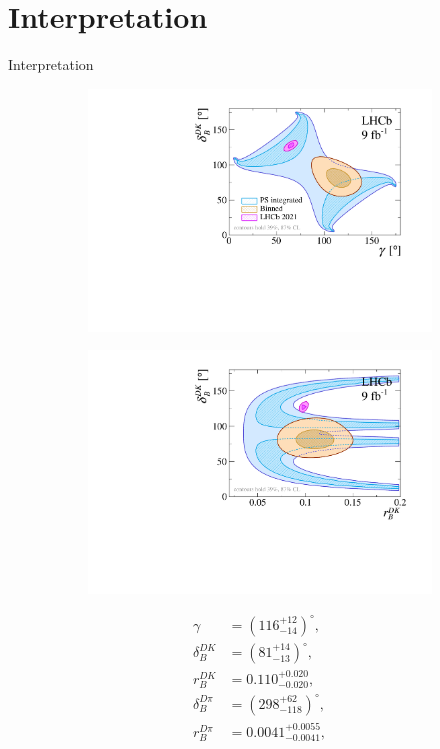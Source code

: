 \documentclass{beamer}
\begin{document}
\section{Interpretation}

\begin{frame}{Interpretation}
  \begin{figure}
    \centering
    \begin{subfigure}{0.50\textwidth}
      \includegraphics[width = 1.0\textwidth]{Plots/gammacharm_lhcb_KKpipi_GLW_KKpipi_GGSZ_lhcb_2020_beauty_and_charm_g_d_dk.pdf}
    \end{subfigure}%
    \begin{subfigure}{0.50\textwidth}
      \includegraphics[width = 1.0\textwidth]{Plots/gammacharm_lhcb_KKpipi_GLW_KKpipi_GGSZ_lhcb_2020_beauty_and_charm_r_dk_d_dk.pdf}
    \end{subfigure}
  \end{figure}
  \vspace{-0.75cm}
  \begin{align*}
    \gamma &= (116^{+12}_{-14})^\circ, \\
    \delta_B^{DK} &= (81^{+14}_{-13})^\circ, \\
    r_B^{DK} &= 0.110^{+0.020}_{-0.020}, \\
    \delta_B^{D\pi} &= (298^{+62}_{-118})^\circ, \\
    r_B^{D\pi} &= 0.0041^{+0.0055}_{-0.0041},
  \end{align*}
\end{frame}
\end{document}
